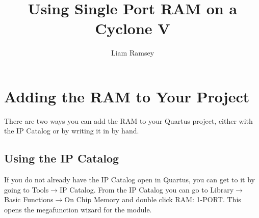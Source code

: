 \documentclass[letter,12pt]{article}
\title{Using Single Port RAM on a Cyclone V}
\author{Liam Ramsey}
\begin{document}
\maketitle

\section{Adding the RAM to Your Project}
There are two ways you can add the RAM to your Quartus project, either with the IP Catalog or by writing it in by hand.

\subsection{Using the IP Catalog}

If you do not already have the IP Catalog open in Quartus, you can get to it by going to Tools$\rightarrow$IP Catalog. From the IP Catalog you can go to Library$\rightarrow$Basic Functions$\rightarrow$On Chip Memory and double click RAM: 1-PORT. This opens the megafunction wizard for the module.
\end{document}
